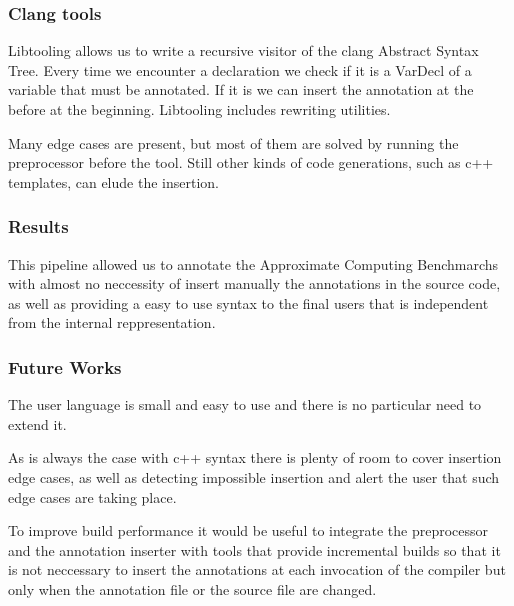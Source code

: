 \documentclass{beamer}
\begin{document}
\begin{frame}[fragile]
	\frametitle{Clang tools}
	\begin{block}{}
		Libtooling allows us to write a recursive visitor of the clang Abstract Syntax Tree. Every time we encounter a declaration we check if it is a VarDecl of a variable that must be annotated. If it is we can insert the annotation at the before at the beginning. Libtooling includes rewriting utilities. 
	\end{block}

	\begin{block}{}
		Many edge cases are present, but most of them are solved by running the preprocessor before the tool. Still other kinds of code generations, such as c++ templates, can elude the insertion.
	\end{block}
	

\end{frame}
\begin{frame}[fragile]
	\frametitle{Results}
	\begin{block}{}
		This pipeline allowed us to annotate the Approximate Computing Benchmarchs with almost no neccessity of insert manually the annotations in the source code, as well as providing a easy to use syntax to the final users that is independent from the internal reppresentation.
	\end{block}


\end{frame}
\begin{frame}[fragile]
	\frametitle{Future Works}
	\begin{block}{}
		The user language is small and easy to use and there is no particular need to extend it.
	\end{block}
	\begin{block}{}
		As is always the case with c++ syntax there is plenty of room to cover insertion edge cases, as well as detecting impossible insertion and alert the user that such edge cases are taking place.
	\end{block}
	\begin{block}{}
		To improve build performance it would be useful to integrate the preprocessor and the annotation inserter with tools that provide incremental builds so that it is not neccessary to insert the annotations at each invocation of the compiler but only when the annotation file or the source file are changed.
	\end{block}


\end{frame}
\end{document}
